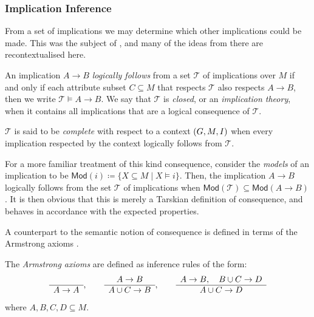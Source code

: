 \subsubsection{Implication Inference}
\label{subsubsection:implication-inference}

From a set of implications we may determine which other implications could be
made. This was the subject of , and many of
the ideas from there are recontextualised here.

\begin{definition}
	\label{definition:implication-inference}

	An implication $A\rightarrow B$ \emph{logically follows} from a set $\mathcal{T}$
	of implications over $M$ if and only if each attribute subset $C \subseteq M$ that
	respects $\mathcal{T}$ also respects $A \rightarrow B$, then we write
	$\mathcal{T}\vDash A \rightarrow B$. We say that $\mathcal{T}$ is \emph{closed},
	or an \emph{implication theory}, when it contains all implications that are a logical
	consequence of $\mathcal{T}$.

	$\mathcal{T}$ is said to be \emph{complete} with respect to a context $(G,M,\mathrel{I})$
	when every implication respected by the context logically follows from
	$\mathcal{T}$.
\end{definition}

For a more familiar treatment of this kind consequence, consider the \textit{models}
of an implication to be $\mathsf{Mod}(i) \coloneqq \{X \subseteq M \mid X \vDash
	i\}$. Then, the implication $A\rightarrow B$ logically follows from the set $\mathcal{T}$
of implications when $\mathsf{Mod}(\mathcal{T}) \subseteq \mathsf{Mod}(A\rightarrow
	B)$. It is then obvious that this is merely a Tarskian definition of consequence,
and behaves in accordance with the expected properties.

A counterpart to the semantic notion of consequence is defined in terms of the Armstrong
axioms \cite{armstrong1974dependency}.

\begin{definition}
	\label{definition:armstrong-axioms} The \emph{Armstrong axioms} are defined as
	inference rules of the form:
	\begin{align}
		\begin{array}{c}  \\ \hline A \rightarrow A \end{array}, \qquad \begin{array}{c} A \rightarrow B \\ \hline A \cup C \rightarrow B \end{array}, \qquad \begin{array}{c} A \rightarrow B, \quad B \cup C \rightarrow D \\ \hline A \cup C \rightarrow D \end{array}
	\end{align}
	where $A,B,C,D \subseteq M$.
\end{definition}

